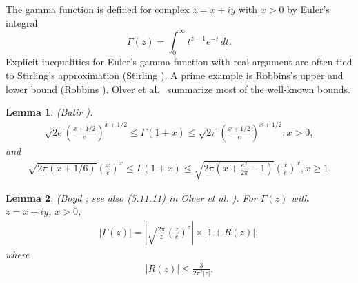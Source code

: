 \documentclass[12pt,reqno,tbtags]{amsart}
\newtheorem{lemma}{Lemma}
\begin{document}
The gamma function is defined for complex $z=x+iy$ with $x> 0$ by Euler's integral
$$
\Gamma (z) = \int_0^\infty t^{z-1} e^{-t} \, dt.
$$
Explicit inequalities for Euler's gamma function with real argument are often tied to Stirling's
approximation (Stirling \cite{Stir}).  A prime example is Robbins's upper and lower bound (Robbins \cite{Ro}).
Olver et al.\ \cite{Ol} summarize most of the well-known bounds.

\begin{lemma}\label{batir} (Batir \cite{Bat}).
\begin{align}\label{batir1}
\sqrt{2e}  \left( \frac{ x + 1/2 }{ e} \right)^{x+1/2} \le \Gamma (1+x) \le \sqrt{2\pi} \left( \frac{ x + 1/2 }{ e} \right)^{x+1/2} , x > 0,
\end{align}
and
\begin{align}\label{batir2}
\sqrt{2\pi (x+ 1/6)}  \left( \frac{ x }{ e} \right)^{x}\le \Gamma (1+x) \le \sqrt{2\pi \left(x+ \frac{e^2 }{ 2\pi} -1 \right) } \left( \frac{ x }{ e} \right)^{x} , x \ge 1.
\end{align}
\end{lemma} 



\begin{lemma}\label{boyd} (Boyd \cite{Boyd}; see also (5.11.11) in Olver et al. \cite{Ol}).
For $\Gamma(z)$ with $z=x+iy$, $x > 0$, 
\begin{align}\label{boyd1}
\left| \Gamma (z) \right| 
= \left| \sqrt{\frac{2 \pi }{ z} }\left( \frac{ z }{ e } \right)^{z} \right| 
\times \left| 1 + R(z) \right|,
\end{align}
where
\begin{align}\label{boyd2}
| R(z) | \le \frac{3 }{ 2 \pi^2 |z|}.
\end{align}
\end{lemma}
\end{document}
